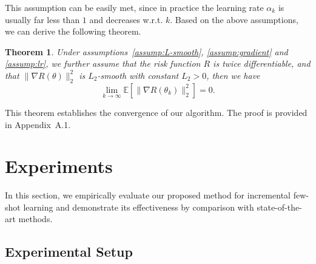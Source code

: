 \documentclass{article}
\newtheorem{theorem}{Theorem}[section]
\begin{document}
This assumption can be easily met, since in practice the learning rate $\alpha_k$ is usually far less than $1$ and decreases w.r.t. $k$. Based on the above assumptions, we can derive the following theorem. 
\begin{theorem}\label{eq:theorem}
Under assumptions~\ref{assump:L-smooth}, \ref{assump:gradient} and \ref{assump:lr}, we further assume that the risk function $R$ is twice differentiable, and that $\|\nabla R(\theta)\|_2^2$ is $L_2$-smooth with constant $L_2>0$, then we have
\begin{equation}
    \lim_{k\to\infty} \mathbb{E}[\|\nabla R(\theta_k)\|_2^2] = 0.
\end{equation}
\end{theorem}
This theorem establishes the convergence of our algorithm. The proof is provided in Appendix~A.1. 



 \section{Experiments}\label{sec:exp}
In this section, we empirically evaluate our proposed method for incremental few-shot learning and demonstrate its effectiveness by comparison with state-of-the-art methods.

\subsection{Experimental Setup}\label{sec:exp_setup}
\end{document}
